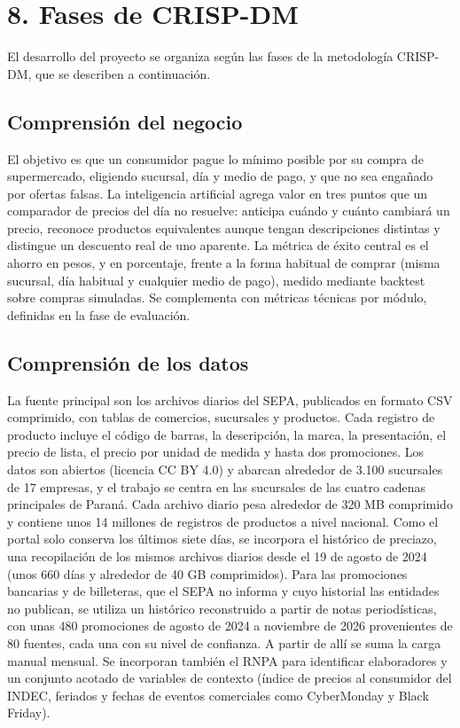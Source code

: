 \documentclass[
11pt, %
]{charter}
\begin{document}
\section{8. Fases de CRISP-DM}
\label{sec:crispdm}

El desarrollo del proyecto se organiza según las fases de la metodología CRISP-DM, que se describen a continuación.

\subsection{Comprensión del negocio}

El objetivo es que un consumidor pague lo mínimo posible por su compra de supermercado, eligiendo sucursal, día y medio de pago, y que no sea engañado por ofertas falsas. La inteligencia artificial agrega valor en tres puntos que un comparador de precios del día no resuelve: anticipa cuándo y cuánto cambiará un precio, reconoce productos equivalentes aunque tengan descripciones distintas y distingue un descuento real de uno aparente. La métrica de éxito central es el ahorro en pesos, y en porcentaje, frente a la forma habitual de comprar (misma sucursal, día habitual y cualquier medio de pago), medido mediante backtest sobre compras simuladas. Se complementa con métricas técnicas por módulo, definidas en la fase de evaluación.

\subsection{Comprensión de los datos}

La fuente principal son los archivos diarios del SEPA, publicados en formato CSV comprimido, con tablas de comercios, sucursales y productos. Cada registro de producto incluye el código de barras, la descripción, la marca, la presentación, el precio de lista, el precio por unidad de medida y hasta dos promociones. Los datos son abiertos (licencia CC BY 4.0) y abarcan alrededor de 3.100 sucursales de 17 empresas, y el trabajo se centra en las sucursales de las cuatro cadenas principales de Paraná. Cada archivo diario pesa alrededor de 320 MB comprimido y contiene unos 14 millones de registros de productos a nivel nacional. Como el portal solo conserva los últimos siete días, se incorpora el histórico de preciazo, una recopilación de los mismos archivos diarios desde el 19 de agosto de 2024 (unos 660 días y alrededor de 40 GB comprimidos). Para las promociones bancarias y de billeteras, que el SEPA no informa y cuyo historial las entidades no publican, se utiliza un histórico reconstruido a partir de notas periodísticas, con unas 480 promociones de agosto de 2024 a noviembre de 2026 provenientes de 80 fuentes, cada una con su nivel de confianza. A partir de allí se suma la carga manual mensual. Se incorporan también el RNPA para identificar elaboradores y un conjunto acotado de variables de contexto (índice de precios al consumidor del INDEC, feriados y fechas de eventos comerciales como CyberMonday y Black Friday).
\end{document}
